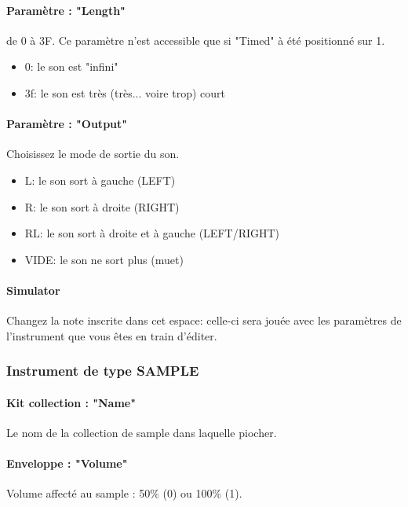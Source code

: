 \documentclass[12pt,a4paper]{article}
\begin{document}
    \paragraph{Paramètre : "Length"} de 0 à 3F.
    Ce paramètre n'est accessible que si "Timed" à été positionné sur 1.
    \medskip

    \begin{itemize}
        \item{0: le son est "infini"}
        \item{3f: le son est très (très... voire trop) court}
    \end{itemize}

    \paragraph{Paramètre : "Output"} Choisissez le mode de sortie du son.
    \medskip
    \begin{itemize}
        \item{L: le son sort à gauche (LEFT)}
        \item{R: le son sort à droite (RIGHT)}
        \item{RL: le son sort à droite et à gauche (LEFT/RIGHT)}
        \item{VIDE: le son ne sort plus (muet)}
    \end{itemize}

    \paragraph{Simulator} Changez la note inscrite dans cet espace:
                celle-ci sera jouée avec les paramètres de l'instrument que vous êtes en train d'éditer.

    \subsubsection{Instrument de type SAMPLE}


    \paragraph{Kit collection : "Name"} Le nom de la collection de sample dans laquelle piocher.

    \paragraph{Enveloppe : "Volume"} Volume affecté au sample : 50\% (0) ou 100\% (1).
\end{document}
